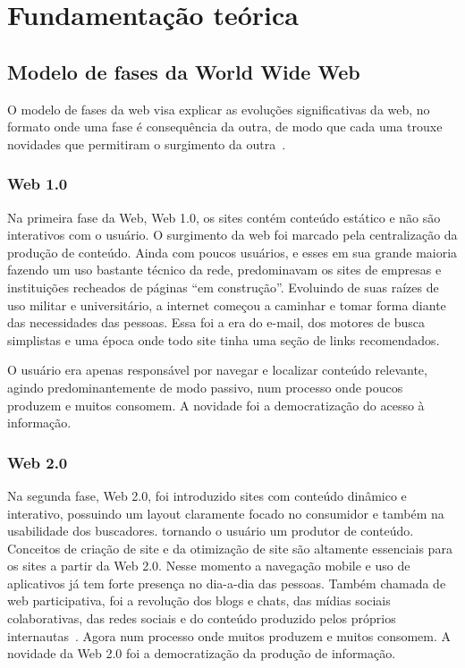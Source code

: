 \chapter{Fundamentação teórica}

\section{Modelo de fases da World Wide Web}

O modelo de fases da web visa explicar as evoluções significativas da web, no formato onde uma fase é consequência da outra, de modo que cada uma trouxe novidades que permitiram o surgimento da outra~\cite{Web31}.

\subsection{Web 1.0}

Na primeira fase da Web, Web 1.0, os sites contém conteúdo estático e não são interativos com o usuário.
O surgimento da web foi marcado pela centralização da produção de conteúdo. 
Ainda com poucos usuários, e esses em sua grande maioria fazendo um uso bastante técnico da rede, predominavam os sites de empresas e instituições recheados de páginas “em construção”. Evoluindo de suas raízes de uso militar e universitário, a internet começou a caminhar e tomar forma diante das necessidades das pessoas. Essa foi a era do e-mail, dos motores de busca simplistas e uma época onde todo site tinha uma seção de links recomendados.

O usuário era apenas responsável por navegar e localizar conteúdo relevante, agindo predominantemente de modo passivo, num processo onde poucos produzem e muitos consomem.
A novidade foi a democratização do acesso à informação.

\subsection{Web 2.0}

Na segunda fase, Web 2.0, foi introduzido sites com conteúdo dinâmico e interativo, possuindo um layout claramente focado no consumidor e também na usabilidade dos buscadores. tornando o usuário um produtor de conteúdo.
Conceitos de criação de site e da otimização de site são altamente essenciais para os sites a partir da Web 2.0.
Nesse momento a navegação mobile e uso de aplicativos já tem forte presença no dia-a-dia das pessoas.
Também chamada de web participativa, foi a revolução dos blogs e chats, das mídias sociais colaborativas, das redes sociais e do conteúdo produzido pelos próprios internautas~\cite{Web32}.
Agora num processo onde muitos produzem e muitos consomem.
A novidade da Web 2.0 foi a democratização da produção de informação.

